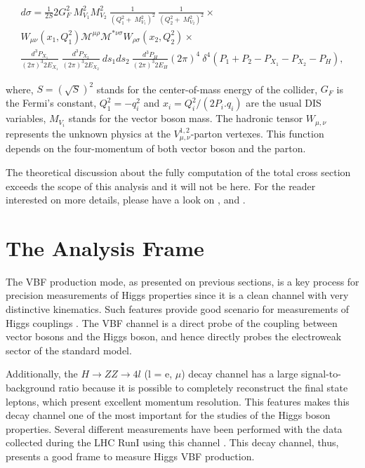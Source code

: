 \begin{eqnarray}
\nonumber
d\sigma = \frac{1}{2S}2G_{F}^{2}~M_{V_{1}}^{2}M_{V_{2}}^{2}~\frac{1}{(Q_{1}^{2}+~M_{V_{1}}^{2})^{2}}~\frac{1}{(Q_{2}^{2}+~M_{V_{2}}^{2})^{2}}\times\\
\nonumber
W_{\mu\nu}(x_{1},Q_{1}^{2})\mathcal{M}^{\mu\rho}\mathcal{M}^{*\nu\sigma}W_{\rho\sigma}(x_{2},Q_{2}^{2})\times\\ \frac{d^{3}P_{X_{1}}}{(2\pi)^{3}2E_{X_{1}}}~\frac{d^{3}P_{X_{2}}}{(2\pi)^{3}2E_{X_{2}}}~ds_{1}ds_{2}~\frac{d^{3}P_{H}}{(2\pi)^{3}2E_{H}}
(2\pi)^{4}~\delta^{4}(P_{1}+P_{2}-P_{X_{1}}-P_{X_{2}}-P_{H}),
\label{eq:vbf_dis_differential_XS}
\end{eqnarray}

where, $S=(\sqrt{S})^{2}$ stands for the center-of-mass energy of the collider, $G_{F}$ is the Fermi's constant, $Q_{1}^{2} = -q_{i}^{2}$ and $x_{i} = Q_{i}^{2}/(2P_{i}.q_{i})$ are the usual DIS variables, $M_{V_{i}}$ stands for the vector boson mass. The hadronic tensor $W_{\mu,\nu}$ represents the unknown physics at the $V_{\mu,\nu}^{1,2}$-parton vertexes. This function depends on the four-momentum of both vector boson and the parton. 

The theoretical discussion about the fully computation of the total cross section exceeds the scope of this analysis and it will not be here. For the reader interested on more details, please have a look on \cite{bib:PhysRep457-1-2005}, \cite{bib:PhysRevLett105-011801-2010} and \cite{bib:PhysRevLett69-3274-1992}.


\section{The Analysis Frame}
The VBF production mode, as presented on previous sections, is a key process for precision measurements of Higgs properties since it is a clean channel with very distinctive kinematics. Such features provide good scenario for measurements of Higgs couplings \cite{bib:PhysRevD62_013009_2000}. The VBF channel is a direct probe of the coupling between vector bosons and the Higgs boson, and hence directly probes the electroweak sector of the standard model.

Additionally, the $H \rightarrow ZZ \rightarrow 4l$ (l = e, $\mu$) decay channel has a large signal-to-background ratio because it is possible to completely reconstruct the final state leptons, which present excellent momentum resolution. This features makes this decay channel one of the most important for the studies of the Higgs boson properties. Several different measurements have been performed with the data collected during the LHC RunI using this channel
\cite{bib:PhysRevLett110-081803-2013,bib:PhysRevD89-092007-2014,bib:PhysLettB-736-64-2014,bib:PhysRevD92-012004-2015,bib:PhysRevD92-072010-2015}. This decay channel, thus, presents a good frame to measure Higgs VBF production.

